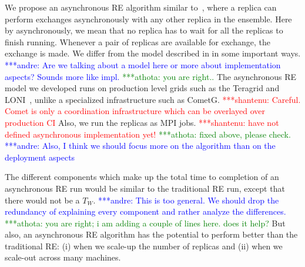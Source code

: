 \documentclass{rspublic}
\newcommand{\jhanote}[1]{ {\textcolor{red} { ***shantenu: #1 }}}
\newcommand{\alnote}[1]{ {\textcolor{blue} { ***andre: #1 }}}
\newcommand{\athotanote}[1]{ {\textcolor{green} { ***athota: #1 }}}
\newcommand{\alnote}[1]{}
\newcommand{\athotanote}[1]{}
\newcommand{\jhanote}[1]{}
\begin{document}
We propose an asynchronous RE algorithm similar
to~\citep{parashar_arepex}, where a replica can perform exchanges
asynchronously with any other replica in the ensemble. Here by 
asynchronously, we mean that no replica has to wait for all the replicas 
to finish running. Whenever a pair of replicas are available for exchange, 
the exchange is made. %
We differ from the model described in \citep{parashar_arepex}
in some important ways. \alnote{Are we talking about a model here or 
more about implementation aspects? Sounds more like impl.}\athotanote{you are right..}
The asynchronous RE model we developed runs on
production level grids such as the Teragrid and LONI~\citep{LONI_web},
unlike a specialized infrastructure such as CometG.
\jhanote{Careful. Comet is only a coordination infrastructure which
  can be overlayed over production CI} Also, we run the replicas as
MPI jobs. \jhanote{have not defined asynchronous implementation yet!} \athotanote{fixed above, please check.}
\alnote{Also, I think we should focus more on the algorithm than on the deployment aspects}


The different components which make up the total time to completion of 
an asynchronous RE run would be similar to the traditional RE run, 
except that there would not be a $T_W$. \alnote{This is too general. 
We should drop the redundancy of explaining every component and rather 
analyze the differences.} \athotanote{you are right; i am adding a couple of lines here. does it help?}But also, an asynchronous RE algorithm has the potential to perform better than the traditional RE: (i) when we scale-up the number of replicas and (ii) when we scale-out across many machines.

\end{document}
